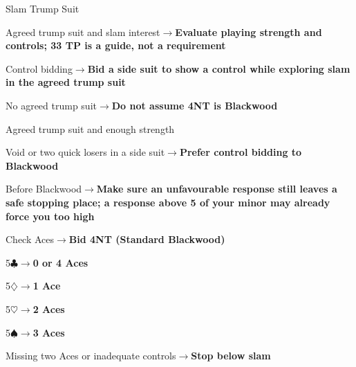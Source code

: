 \documentclass[10pt,letterpaper]{article}
\newcommand{\C}{\ensuremath{\clubsuit}}
\newcommand{\D}{\ensuremath{\diamondsuit}}
\newcommand{\Hh}{\ensuremath{\heartsuit}}
\renewcommand{\S}{\ensuremath{\spadesuit}}
\begin{document}
\begin{minipage}[t]{0.485\textwidth}
\begin{guidecard}{Slam Trump Suit}
\begin{branches}
\item Agreed trump suit and slam interest\;\ensuremath{\longrightarrow}\;\textbf{Evaluate playing strength and controls; 33 TP is a guide, not a requirement}
\item Control bidding\;\ensuremath{\longrightarrow}\;\textbf{Bid a side suit to show a control while exploring slam in the agreed trump suit}
\item No agreed trump suit\;\ensuremath{\longrightarrow}\;\textbf{Do not assume 4NT is Blackwood}
\item Agreed trump suit and enough strength
\begin{branches}
\item Void or two quick losers in a side suit\;\ensuremath{\longrightarrow}\;\textbf{Prefer control bidding to Blackwood}
\item Before Blackwood\;\ensuremath{\longrightarrow}\;\textbf{Make sure an unfavourable response still leaves a safe stopping place; a response above 5 of your minor may already force you too high}
\item Check Aces\;\ensuremath{\longrightarrow}\;\textbf{Bid 4NT (Standard Blackwood)}
\begin{branches}
\item 5\C{}\;\ensuremath{\longrightarrow}\;\textbf{0 or 4 Aces}
\item 5\D{}\;\ensuremath{\longrightarrow}\;\textbf{1 Ace}
\item 5\Hh{}\;\ensuremath{\longrightarrow}\;\textbf{2 Aces}
\item 5\S{}\;\ensuremath{\longrightarrow}\;\textbf{3 Aces}
\end{branches}
\end{branches}
\item Missing two Aces or inadequate controls\;\ensuremath{\longrightarrow}\;\textbf{Stop below slam}
\end{branches}
\end{guidecard}

\end{minipage}\hfill
\end{document}
